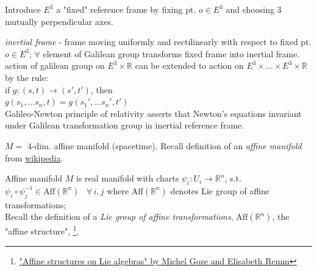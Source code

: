 \documentclass[10pt]{amsart}
\begin{document}
\begin{multicols*}{2}
Introduce $E^3$ a "fixed" reference frame by fixing pt. $o \in E^3$ and choosing 3 mutually perpendicular axes.

\emph{inertial frame} - frame moving uniformly and rectilinearly with respect to fixed pt. $o \in E^3$; $\forall $ element of Galilean group transforms fixed frame into inertial frame. \\

action of galilean group on $E^3 \times \mathbb{R}$ can be extended to action on $E^3 \times \dots \times E^3 \times \mathbb{R}$ by the rule: \\
if $g: (s,t) \to (s',t')$, then \\
\phantom{if} $g(s_1, \dots s_n, t) = g(s_1' , \dots s_n', t')$ \\

Galileo-Newton principle of relativity asserts that Newton's equations invariant under Galilean transformation group in inertial reference frame.

$M = $ 4-dim. affine manifold (spacetime). Recall definition of an \emph{affine manifold} from \href{https://en.wikipedia.org/wiki/Affine_manifold}{wikipedia}.

Affine manifold $M$ is real manifold with charts $\psi_i : U_i \to \mathbb{R}^n$, s.t. $\psi_i \circ \psi_j^{-1} \in \text{Aff}(\mathbb{R}^n)$ \, $\forall \, i ,j$ where $\text{Aff}{(\mathbb{R}^n)}$ denotes Lie group of affine transformations; \\

Recall the definition of a \emph{Lie group of affine transformations}, $\text{Aff}{(\mathbb{R}^n)}$, the "affine structure", \footnote{\href{http://citeseerx.ist.psu.edu/viewdoc/download?doi=10.1.1.627.5443&rep=rep1&type=pdf}{"Affine structures on Lie algebras" by Michel Goze and Elisabeth Remm}},


\end{multicols*}
\end{document}
